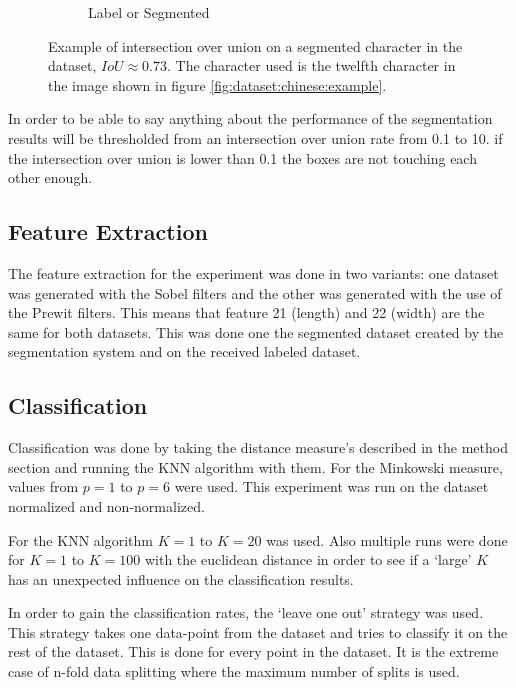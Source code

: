 \begin{figure}[ht]
\begin{subfigure}{0.24\textwidth}
    \caption{Label or Segmented}
    \label{fig:experiment:or}
  \end{subfigure}
  \caption{Example of intersection over union on a segmented character in the dataset, $IoU \approx 0.73$. The character used is the twelfth character in the image shown in figure \ref{fig:dataset:chinese:example}. }
  \label{fig:experiment:iou:example}
\end{figure}

In order to be able to say anything about the performance of the segmentation results will be thresholded from an intersection over union rate from 0.1 to 10. if the intersection over union is lower than 0.1 the boxes are not touching each other enough.


\subsection{Feature Extraction}

The feature extraction for the experiment was done in two variants: one dataset was generated with the Sobel filters and the other was generated with the use of the Prewit filters. This means that feature 21 (length) and 22 (width) are the same for both datasets. This was done one the segmented dataset created by the segmentation system and on the received labeled dataset.
\subsection{Classification}

Classification was done by taking the distance measure's described in the method section  and running the KNN algorithm with them. For the Minkowski measure, values from $p=1$ to $p=6$ were used. This experiment was run on the dataset normalized and non-normalized.

For the KNN algorithm $K=1$ to $K=20$ was used. Also multiple runs were done for $K=1$ to $K=100$ with the euclidean distance in order to see if a `large' $K$ has an unexpected influence on the classification results.

In order to gain the classification rates, the `leave one out' strategy was used. This strategy takes one data-point from the dataset and tries to classify it on the rest of the dataset. This is done for every point in the dataset. It is the extreme case of n-fold data splitting where the maximum number of splits is used.






